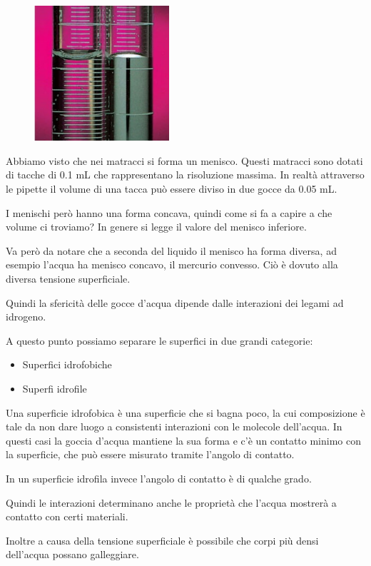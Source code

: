 \hspace{0.5cm}\begin{minipage}{0.35 \textwidth}
    \begin{figure}[H]
        \includegraphics[width=5cm]{immagini/menischi.png}
    \end{figure}
\end{minipage}
\begin{minipage}{0.6 \textwidth}
    \vspace{0.6cm}Abbiamo visto che nei matracci si forma un menisco.
    Questi matracci sono dotati di tacche di 0.1 mL che rappresentano la risoluzione massima. In realtà attraverso le pipette il volume di una tacca può essere diviso in due gocce da 0.05 mL.

    I menischi però hanno una forma concava, quindi come si fa a capire a che volume ci troviamo? In genere si legge il valore del menisco inferiore.

    Va però da notare che a seconda del liquido il menisco ha forma diversa, ad esempio l'acqua ha menisco concavo, il mercurio convesso. Ciò è dovuto alla diversa tensione superficiale.
\end{minipage}

\vspace{0.2cm}Quindi la sfericità delle gocce d'acqua dipende dalle interazioni dei legami ad idrogeno.

A questo punto possiamo separare le superfici in due grandi categorie:

\begin{itemize}
    \item Superfici idrofobiche
    \item Superfi idrofile
\end{itemize}

Una superficie idrofobica è una superficie che si bagna poco, la cui composizione è tale da non dare luogo a consistenti interazioni con le molecole dell'acqua. In questi casi la goccia d'acqua mantiene la sua forma e c'è un contatto minimo con la superficie, che può essere misurato tramite l'angolo di contatto.

In un superficie idrofila invece l'angolo di contatto è di qualche grado.

Quindi le interazioni determinano anche le proprietà che l'acqua mostrerà a contatto con certi materiali.

Inoltre a causa della tensione superficiale è possibile che corpi più densi dell'acqua possano galleggiare.